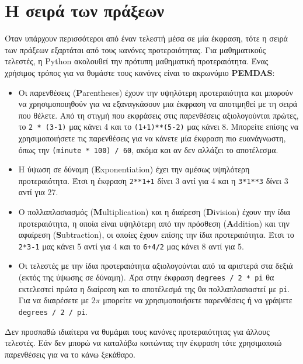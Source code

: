 \documentclass[10pt]{book}
\begin{document}
\section{Η σειρά των πράξεων}
Όταν υπάρχουν περισσότεροι από έναν τελεστή μέσα σε μία έκφραση, τότε 
η σειρά των πράξεων εξαρτάται από τους κανόνες προτεραιότητας.  
Για μαθηματικούς τελεστές, η Python  ακολουθεί την πρότυπη
μαθηματική προτεραιότητα.  Ένας χρήσιμος τρόπος για να θυμάστε τους
κανόνες είναι το ακρωνύμιο {\bf PEMDAS}:

\begin{itemize}

\item Οι παρενθέσεις ({\bf P}arentheses) έχουν την υψηλότερη προτεραιότητα και μπορούν να χρησιμοποιηθούν για να εξαναγκάσουν μια έκφραση να αποτιμηθεί με
τη σειρά που θέλετε. Από τη στιγμή που εκφράσεις στις παρενθέσεις
αξιολογούνται πρώτες, το {\tt 2 * (3-1)} μας κάνει 4 και το
{\tt (1+1)**(5-2)} μας κάνει 8. Μπορείτε επίσης να χρησιμοποιήσετε
τις παρενθέσεις για να κάνετε μία έκφραση πιο ευανάγνωστη, όπως την 
{\tt (minute * 100) / 60}, ακόμα και αν δεν αλλάζει το αποτέλεσμα.

\item
Η ύψωση σε δύναμη ({\bf E}xponentiation) έχει την αμέσως υψηλότερη
προτεραιότητα. Έτσι η έκφραση {\tt 2**1+1} δίνει 3 αντί για 4 και η {\tt 3*1**3} δίνει 3 αντί για 27.

\item Ο πολλαπλασιασμός ({\bf M}ultiplication) 
και η διαίρεση ({\bf D}ivision) έχουν την ίδια προτεραιότητα,
η οποία είναι υψηλότερη από την πρόσθεση ({\bf A}ddition)  και
την αφαίρεση ({\bf S}ubtraction), οι οποίες έχουν επίσης την
ίδια προτεραιότητα.  Έτσι το {\tt 2*3-1} μας κάνει 5 αντί για 4 και 
το {\tt 6+4/2} μας κάνει 8 αντί για 5.

\item Οι τελεστές με την ίδια προτεραιότητα αξιολογούνται από τα
αριστερά στα δεξιά (εκτός της ύψωσης σε δύναμη). Άρα στην έκφραση 
{\tt degrees / 2 * pi} θα εκτελεστεί πρώτα η διαίρεση και το αποτέλεσμά
της θα πολλαπλασιαστεί με {\tt pi}. Για να διαιρέσετε με $2 \pi$
μπορείτε να χρησιμοποιήσετε παρενθέσεις ή να γράψετε {\tt degrees / 2 / pi}.

\end{itemize}

Δεν προσπαθώ ιδιαίτερα να θυμάμαι τους κανόνες προτεραιότητας για
άλλους τελεστές. Εάν δεν μπορώ να καταλάβω κοιτώντας την έκφραση τότε
χρησιμοποιώ παρενθέσεις για να το κάνω ξεκάθαρο.
\end{document}
